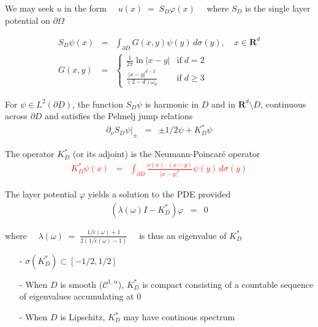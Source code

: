 \documentclass[mathserif,9pt]{beamer}
\def\a{{\alpha }}
\def\ds{\displaystyle}
\def\vf{{\varphi}}
\def\R{\mathbf R}
\begin{document}
\begin{frame}
\small{


We may seek $u$ in the form 
\textcolor{ox}{$\quad u(x)\;=\; S_{D} \vf(x) \quad$}
where $S_D$ is the single layer potential on $\partial \Omega$

\textcolor{ox}{
\begin{eqnarray*}
S_D \psi(x) &=& \ds\int_{\partial D} G(x,y) \psi(y) \, d\sigma(y),
\quad x \in \R^d
\\
G(x,y) &=& \left\{ \begin{array}{ll}
\ds\frac{1}{2\pi} \ln|x-y| & \textrm{if}\; d=2
\\
\ds\frac{|x-y|^{d-2}}{(2-d)\omega_d} & \textrm{if}\; d \geq 3
\end{array} \right.
\end{eqnarray*}}
\medskip

For $\psi \in L^2(\partial D)$,
the function $S_D \psi$ is harmonic in $D$ and in $\R^d \setminus D$,
continuous across $\partial D$ and satisfies the Pelmelj jump relations
\textcolor{ox}{
\begin{eqnarray*}
\partial_\nu S_D \psi |_\pm
&=& \pm 1/2 \psi + K^*_{D} \psi
\end{eqnarray*}}
\medskip

The operator $K^*_{D}$ (or its adjoint) is the Neumann-Poincar\'e operator
\textcolor{red}{
\begin{eqnarray*}
K^*_D \psi(x)
&=& \ds\int_{\partial D} 
\ds\frac{\nu(x)\cdot(x-y)}{|x-y|^2} \psi(y) \,d\sigma(y)
\end{eqnarray*}}
 
}
\end{frame}
\begin{frame}
\small{

The layer potential $\vf$ yields a solution to the PDE provided
\textcolor{ox}{
\begin{eqnarray*}
(\lambda(\omega) I - K^*_D)\vf &=& 0
\end{eqnarray*}}

where \textcolor{ox}{$\quad \lambda(\omega) \;=\; \ds\frac{1/\hat{\epsilon}(\omega) + 1}
{2(1/\hat{\epsilon}(\omega) - 1)}\quad$}
is thus an eigenvalue of $K^*_D$
\bigskip

\begin{itemize}
\item[-]
$\sigma(K^*_D) \subset [-1/2,1/2]$
\medskip

\item[-]
When $D$ is smooth (${\mathcal C}^{1,\a}$), 
$K^*_D$ is compact consisting of a countable sequence of eigenvalues accumulating
at $0$
\medskip

\item[-]
When $D$ is Lipschitz, $K^*_D$ may have continous spectrum
\end{itemize}
 
}
\end{frame}
\end{document}
